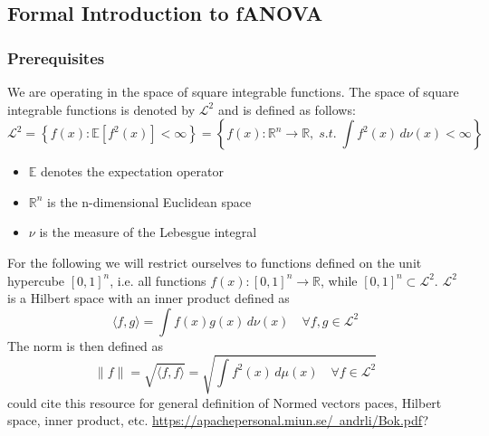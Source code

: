 

\subsection{Formal Introduction to fANOVA}
\subsubsection*{Prerequisites}
We are operating in the space of square integrable functions. The space of square integrable functions is denoted by $\mathcal{L}^2$ and is defined as follows:
\[
\mathcal{L}^2 = \left\{ f(x) : \mathbb{E}[f^2(x)] < \infty \right\}
= \left\{ f(x) : \mathbb{R}^{n} \to \mathbb{R}, \; \textit{s.t.} \; \int f^2(x)\, d\nu(x) < \infty \right\}
\]
\begin{itemize}
    \item $\mathbb{E}$ denotes the expectation operator
    \item $\mathbb{R}^{n}$ is the n-dimensional Euclidean space
    \item $\nu$ is the measure of the Lebesgue integral
\end{itemize}
For the following we will restrict ourselves to functions defined on the unit hypercube $[0,1]^n$, i.e. all functions $f(x): [0,1]^n \rightarrow \mathbb{R}$, while $[0,1]^n \subset \mathcal{L}^2$. $\mathcal{L}^2$ is a Hilbert space with an inner product defined as
\[
\langle f, g \rangle = \int f(x) g(x) \, d\nu(x) \quad \forall f, g \in \mathcal{L}^2
\]
The norm is then defined as
\[
\|f\| = \sqrt{\langle f, f \rangle} = \sqrt{\int f^2(x) \, d\mu(x) \quad \forall f \in \mathcal{L}^2}
\]
{\color{blue} could cite this resource for general definition of Normed vectors paces, Hilbert space, inner product, etc. \href{https://apachepersonal.miun.se/~andrli/Bok.pdf}{https://apachepersonal.miun.se/~andrli/Bok.pdf}?}


